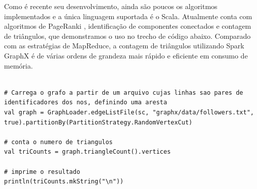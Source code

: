 Como é recente seu desenvolvimento, ainda são poucos os algoritmos implementados e a única linguagem 
suportada é o Scala. Atualmente conta com algoritmos de PageRanki \cite{brin2012reprint}, identificação 
de componentes conectados e contagem de triângulos, que demonstramos o uso no trecho de código abaixo. 
Comparado com as estratégias de MapReduce, a contagem de triângulos utilizando Spark GraphX é de 
várias ordens de grandeza mais rápido e eficiente em consumo de memória. 


\begin{lstlisting}[style=MyPythonStyle]

# Carrega o grafo a partir de um arquivo cujas linhas sao pares de identificadores dos nos, definindo uma aresta
val graph = GraphLoader.edgeListFile(sc, "graphx/data/followers.txt", true).partitionBy(PartitionStrategy.RandomVertexCut)

# conta o numero de triangulos
val triCounts = graph.triangleCount().vertices

# imprime o resultado
println(triCounts.mkString("\n"))

\end{lstlisting}
